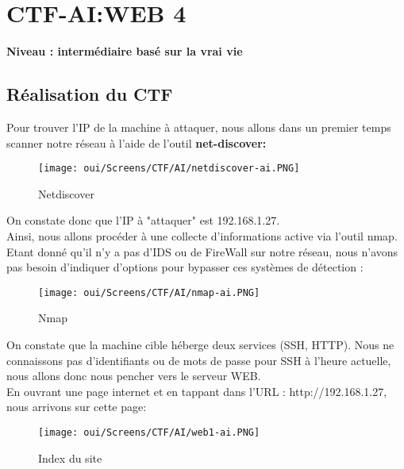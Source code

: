 \newpage
\section{CTF-AI:WEB 4}

\noindent \textbf{Niveau : intermédiaire basé sur la vrai vie}

\subsection{Réalisation du CTF}

Pour trouver l'IP de la machine à attaquer, nous allons dans un premier temps scanner notre réseau à l'aide de l'outil  \textbf{net-discover:}

\begin{figure}[htp!]
  \centering
  \setlength\figureheight{7cm}
  \setlength\figurewidth{9cm}
  \texttt{[image: oui/Screens/CTF/AI/netdiscover-ai.PNG]}
  \caption{Netdiscover}
  \label{fig:courbe-tikz}
\end{figure}

\noindent On constate donc que l'IP à "attaquer" est 192.168.1.27.\\

\noindent Ainsi, nous allons procéder à une collecte d'informations active via l'outil nmap. Etant donné qu'il n'y a pas d'IDS ou de FireWall sur notre réseau, nous n'avons pas besoin d'indiquer d'options pour bypasser ces systèmes de détection : 

\begin{figure}[htp!]
  \centering
  \setlength\figureheight{7cm}
  \setlength\figurewidth{9cm}
  \texttt{[image: oui/Screens/CTF/AI/nmap-ai.PNG]}
  \caption{Nmap}
  \label{fig:courbe-tikz}
\end{figure}

\newpage
\noindent On constate que la machine cible héberge deux services (SSH, HTTP). Nous ne connaissons pas d'identifiants ou de mots de passe pour SSH à l'heure actuelle, nous allons donc nous pencher vers le serveur WEB.\\

\noindent En ouvrant une page internet et en tappant dans l'URL : http://192.168.1.27, nous arrivons sur cette page:

\begin{figure}[htp!]
  \centering
  \setlength\figureheight{7cm}
  \setlength\figurewidth{9cm}
  \texttt{[image: oui/Screens/CTF/AI/web1-ai.PNG]}
  \caption{Index du site}
  \label{fig:courbe-tikz}
\end{figure}

